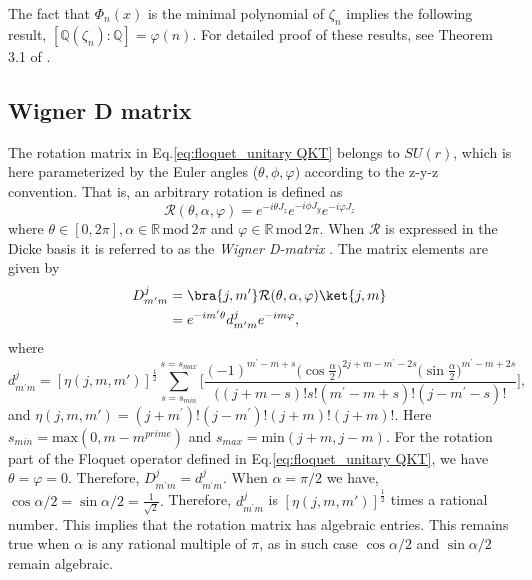 \documentclass[a4paper,onecolumn,accepted=2026-04-08,10pt]{quantumarticle}
\theoremstyle{definition}
\begin{document}
The fact that $\varPhi_n(x)$ is the minimal polynomial of $\zeta_n$
implies the following result, $[\mathbb{Q}(\zeta_n) : \mathbb{Q}] = \varphi(n).$ For detailed proof of these results, see Theorem 3.1 of \cite{lang_2002_algebra}. 


\subsection{Wigner D matrix}

The rotation matrix in Eq.\eqref{eq:floquet_unitary QKT} belongs to  $SU(r)$, which is here parameterized by the Euler angles ($\theta,\phi,\varphi)$ according to the z-y-z convention. That is, an arbitrary rotation is defined as 
\begin{equation}\label{eq:general rotation}
    \mathcal{R}(\theta,\alpha,\varphi) = e^{-i\theta J_z} e^{-i\phi J_y} e^{-i\varphi J_z}
\end{equation}
where $\theta \in [0,2\pi], \alpha \in \mathbb{R} \, \text{mod} \, 2\pi$ and $\varphi \in \mathbb{R}  \, \text{mod}\,  2\pi$.  When $\mathcal{R}$ is expressed in the Dicke basis it is referred to as the \textit{Wigner D-matrix} \cite{Biedenharn_Louck_Carruthers_1984}. The matrix elements are given by
\begin{equation}
\begin{aligned}
     D^j_{m^{\prime}m}  &= \bra{j,m^{\prime}}\mathcal{R}(\theta,\alpha,\varphi) \ket{j,m}\\
    &=e^{-im^{\prime}\theta}d^j_{{m^{\prime}m}}e^{-im\varphi},
\end{aligned}
\end{equation}
where 
\begin{equation*}
    d^j_{m^{\prime}m}=[\eta(j,m,m')]^{\frac{1}{2}}\sum_{s=s_{min}}^{s=s_{max}}\Bigg[\frac{(-1)^{m^{\prime}-m+s}\big(\cos\frac{\alpha}{2}\big)^{2j+m-m^{\prime}-2s}\big(\sin\frac{\alpha}{2}\big)^{m^{\prime}-m+2s}}{((j+m-s)!s!(m^{\prime}-m+s)!(j-m^{\prime}-s)!}\Bigg],
\end{equation*}
and $\eta(j,m,m') = (j+m^{\prime})!(j-m^{\prime})!(j+m)!(j+m)!$. Here $s_{min}=\text{max}(0,m-m^{prime})$ and $s_{max}=\text{min}(j+m,j-m)$. For the rotation part of the Floquet operator defined in Eq.\eqref{eq:floquet_unitary QKT}, we have $\theta=\varphi=0$. 
Therefore, $D^j_{m^{\prime}m} = d^j_{m^{\prime}m}$. When $\alpha = \pi/2$ we have, $\cos{\alpha/2} = \sin{\alpha/2} = \frac{1}{\sqrt{2}}.$ Therefore, $d^j_{m^{\prime}m}$ is $[\eta(j,m,m')]^{\frac{1}{2}}$ times a rational number. This implies that the rotation matrix has algebraic entries. This remains true when $\alpha$ is any rational multiple of $\pi$, as in such case $\cos{\alpha/2}$ and $\sin{\alpha/2}$ remain algebraic. 

\printbibliography
% 
% 
\end{document}
